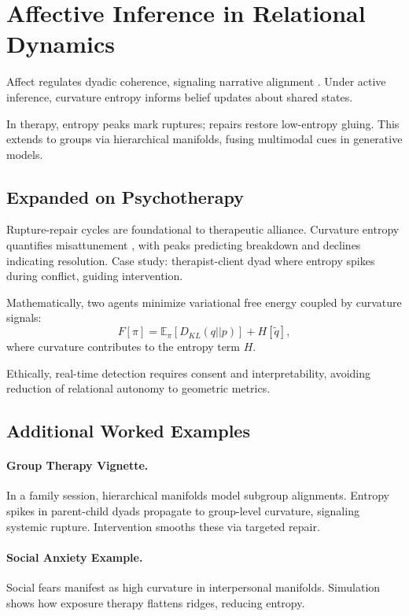 \documentclass{article}
\theoremstyle{definition}
\begin{document}
\section{Affective Inference in Relational Dynamics}

Affect regulates dyadic coherence, signaling narrative alignment \cite{hinrichs2025hyperscanning}. Under active inference, curvature entropy informs belief updates about shared states.

In therapy, entropy peaks mark ruptures; repairs restore low-entropy gluing. This extends to groups via hierarchical manifolds, fusing multimodal cues in generative models.

\subsection{Expanded on Psychotherapy}

Rupture-repair cycles are foundational to therapeutic alliance. Curvature entropy quantifies misattunement \cite{bolis2017dialectical}, with peaks predicting breakdown and declines indicating resolution. Case study: therapist-client dyad where entropy spikes during conflict, guiding intervention.

Mathematically, two agents minimize variational free energy coupled by curvature signals:
\[
F[\pi] = \mathbb{E}_\pi [D_{KL}(q||p)] + H[\tilde{q}],
\]
where curvature contributes to the entropy term $H$.

Ethically, real-time detection requires consent and interpretability, avoiding reduction of relational autonomy to geometric metrics.

\subsection{Additional Worked Examples}

\paragraph{Group Therapy Vignette.}
In a family session, hierarchical manifolds model subgroup alignments. Entropy spikes in parent-child dyads propagate to group-level curvature, signaling systemic rupture. Intervention smooths these via targeted repair.

\paragraph{Social Anxiety Example.}
Social fears manifest as high curvature in interpersonal manifolds. Simulation shows how exposure therapy flattens ridges, reducing entropy.
\end{document}
